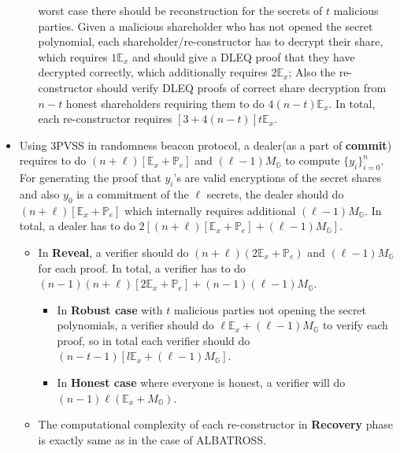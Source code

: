 \begin{itemize}
\begin{itemize}
            worst case there should be reconstruction for the secrets of $t$ 
            malicious parties. Given a malicious shareholder who has not opened 
            the secret polynomial, each shareholder/re-constructor has to 
            decrypt their share, which requires $1\mathbb{E}_{x}$ and should 
            give a DLEQ proof that they have decrypted correctly, which 
            additionally requires $2\mathbb{E}_x$; Also the re-constructor 
            should verify DLEQ proofs of correct share decryption from $n-t$ 
            honest shareholders requiring them to do $4(n-t)\mathbb{E}_{x}$. 
            In total, each re-constructor requires $[3+4(n-t)]t\mathbb{E}_{x}$.
        \end{itemize}
    \item Using 3PVSS in randomness beacon protocol, a dealer(as a part of \textbf{commit}) requires to do $(n+\ell)[\mathbb{E}_x+\mathbb{P}_e]$ and $(\ell-1)M_\mathbb{G}$ to compute $\{y_i\}_{i=0}^{n}$. For generating the proof that $y_i$'s are valid encryptions of the secret shares and also $y_0$ is a commitment of the $\ell$ secrets, the dealer should do $(n+\ell)[\mathbb{E}_x+\mathbb{P}_e]$ which internally requires additional $(\ell-1)M_\mathbb{G}$. In total, a dealer has to do $2\left[(n+\ell)[\mathbb{E}_x+\mathbb{P}_e]+(\ell-1)M_\mathbb{G}\right]$.
    \begin{itemize}
        \item In \textbf{Reveal}, a verifier should do $(n+\ell)(2\mathbb{E}_x+\mathbb{P}_e)$ and $(\ell-1)M_\mathbb{G}$ for each proof. In total, a verifier has to do $(n-1)(n+\ell)[2\mathbb{E}_x+\mathbb{P}_e]+(n-1)(\ell-1)M_\mathbb{G}$.
        \begin{itemize}
            \item In \textbf{Robust case} with $t$ malicious parties not opening the secret polynomials, a verifier should do $\ell\mathbb{E}_x+(\ell-1)M_\mathbb{G}$ to verify each proof, so in total each verifier should do $(n-t-1)[l\mathbb{E}_x+(\ell-1)M_\mathbb{G}]$.
            \item In \textbf{Honest case} where everyone is honest, a verifier will do $(n-1)\ell(\mathbb{E}_x+M_\mathbb{G})$.
        \end{itemize}
        \item The computational complexity of each re-constructor in \textbf{Recovery} phase is exactly same as in the case of ALBATROSS.
    \end{itemize}
\end{itemize}

